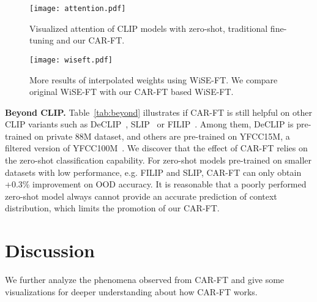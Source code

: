 \documentclass[pdflatex,sn-basic,iicol]{sn-jnl}
\theoremstyle{thmstyleone}\newtheorem{theorem}{Theorem}\newtheorem{proposition}[theorem]{Proposition}
\theoremstyle{thmstyletwo}\newtheorem{example}{Example}\newtheorem{remark}{Remark}
\theoremstyle{thmstylethree}\newtheorem{definition}{Definition}
\begin{document}
\begin{figure*}[t]
    \centering
    \texttt{[image: attention.pdf]}
    \caption{Visualized attention of CLIP models with zero-shot, traditional fine-tuning and our CAR-FT.}
    \label{fig:attention}
\end{figure*}

\begin{figure*}[t]
    \centering
    \texttt{[image: wiseft.pdf]}
    \caption{More results of interpolated weights using WiSE-FT. We compare original WiSE-FT with our CAR-FT based WiSE-FT.}
    \label{fig:wiseft}
\end{figure*}

\noindent\textbf{Beyond CLIP.} Table~\ref{tab:beyond} illustrates if CAR-FT is still helpful on other CLIP variants such as DeCLIP~\citep{li2021supervision}, SLIP~\citep{mu2022slip} or FILIP~\citep{yao2021filip}. Among them, DeCLIP is pre-trained on private 88M dataset, and others are pre-trained on YFCC15M, a filtered version of YFCC100M~\citep{thomee2016yfcc100m}. We discover that the effect of CAR-FT relies on the zero-shot classification capability. For zero-shot models pre-trained on smaller datasets with low performance, e.g. FILIP and SLIP, CAR-FT can only obtain +0.3\% improvement on OOD accuracy. It is reasonable that a poorly performed zero-shot model always cannot provide an accurate prediction of context distribution, which limits the promotion of our CAR-FT. 

\section{Discussion}
We further analyze the phenomena observed from CAR-FT and give some visualizations for deeper understanding about how CAR-FT works. 
\end{document}

